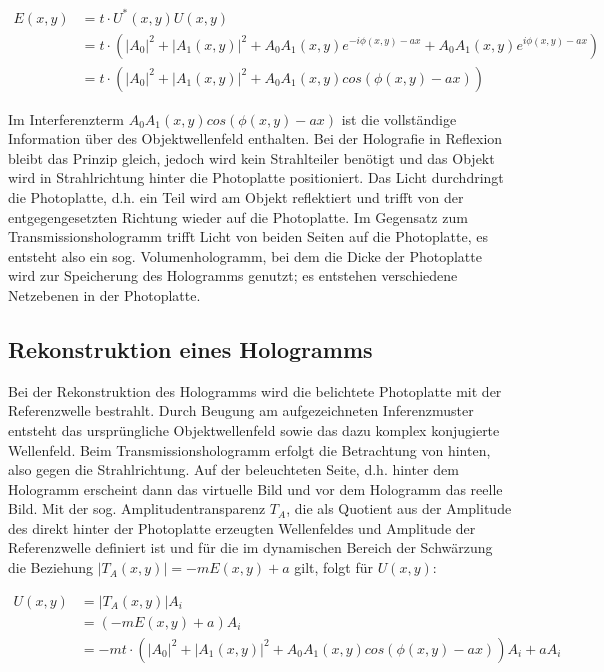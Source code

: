 \documentclass[bigchapter,colorback,accentcolor=tud4b,linedtoc,11pt]{tudreport}
\begin{document}
\begin{align*}
E(x,y) &= t \cdot U^*(x,y) U(x,y) \\
       &= t \cdot \left( |A_0|^2 + |A_1(x,y)|^2 + A_0 A_1(x,y) e^{-i \phi (x,y) -ax} + A_0 A_1(x,y) e^{i \phi (x,y) -ax} \right) \\
       &= t \cdot \left( |A_0|^2 + |A_1(x,y)|^2 + A_0 A_1(x,y) cos(\phi (x,y) -ax) \right)
\end{align*}

Im Interferenzterm $A_0 A_1(x,y) cos(\phi (x,y) -ax)$ ist die vollständige Information über des Objektwellenfeld enthalten. Bei der Holografie in Reflexion bleibt das Prinzip gleich, jedoch wird kein Strahlteiler benötigt und das Objekt wird in Strahlrichtung hinter die Photoplatte positioniert. Das Licht durchdringt die Photoplatte, d.h. ein Teil wird am Objekt reflektiert und trifft von der entgegengesetzten Richtung wieder auf die Photoplatte. Im Gegensatz zum Transmissionshologramm trifft Licht von beiden Seiten auf die Photoplatte, es entsteht also ein sog. Volumenhologramm, bei dem die Dicke der Photoplatte wird zur Speicherung des Hologramms genutzt; es entstehen verschiedene Netzebenen in der Photoplatte.

\subsection{Rekonstruktion eines Hologramms}

Bei der Rekonstruktion des Hologramms wird die belichtete Photoplatte mit der Referenzwelle bestrahlt. Durch Beugung am aufgezeichneten Inferenzmuster entsteht das ursprüngliche Objektwellenfeld sowie das dazu komplex konjugierte Wellenfeld. Beim Transmissionshologramm erfolgt die Betrachtung von hinten, also gegen die Strahlrichtung. Auf der beleuchteten Seite, d.h. hinter dem Hologramm erscheint dann das virtuelle Bild und vor dem Hologramm das reelle Bild. Mit der sog. Amplitudentransparenz $T_A$, die als Quotient aus der Amplitude des direkt hinter der Photoplatte erzeugten Wellenfeldes und Amplitude der Referenzwelle definiert ist und für die im dynamischen Bereich der Schwärzung die Beziehung $|T_A(x,y)| = -m E(x,y) + a$ gilt, folgt für $U(x,y)$:

\begin{align*}
U(x,y) &= |T_A(x,y)| A_i \\
       &= (-m E(x,y) + a) A_i \\
       &= -mt \cdot \left( |A_0|^2 + |A_1(x,y)|^2 + A_0 A_1(x,y) cos(\phi (x,y) -ax) \right) A_i + aA_i
\end{align*}
\end{document}
